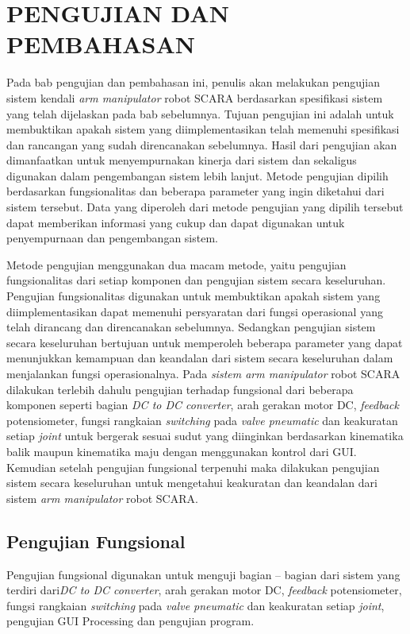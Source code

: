 
\chapter{PENGUJIAN DAN PEMBAHASAN}
Pada bab pengujian dan pembahasan ini, penulis akan melakukan pengujian sistem kendali\textit{ arm manipulator} robot SCARA berdasarkan spesifikasi sistem yang telah dijelaskan pada bab sebelumnya. Tujuan pengujian ini adalah untuk membuktikan apakah sistem yang diimplementasikan telah memenuhi spesifikasi dan rancangan yang sudah direncanakan sebelumnya. Hasil dari pengujian akan dimanfaatkan untuk menyempurnakan kinerja dari sistem dan sekaligus digunakan dalam pengembangan sistem lebih lanjut. Metode pengujian dipilih berdasarkan fungsionalitas dan beberapa parameter yang ingin diketahui dari sistem tersebut. Data yang diperoleh dari metode pengujian yang dipilih tersebut dapat memberikan informasi yang cukup dan dapat digunakan untuk penyempurnaan dan pengembangan sistem.

Metode pengujian menggunakan dua macam metode, yaitu pengujian fungsionalitas dari setiap komponen dan pengujian sistem secara keseluruhan. Pengujian fungsionalitas digunakan untuk membuktikan apakah sistem yang diimplementasikan dapat memenuhi persyaratan dari fungsi operasional yang telah dirancang dan direncanakan sebelumnya. Sedangkan pengujian sistem secara keseluruhan bertujuan untuk memperoleh beberapa parameter yang dapat menunjukkan kemampuan dan keandalan dari sistem secara keseluruhan dalam menjalankan fungsi operasionalnya. Pada \textit{sistem arm manipulator} robot SCARA dilakukan terlebih dahulu pengujian terhadap fungsional dari beberapa komponen seperti bagian \textit{DC to DC converter}, arah gerakan motor DC, \textit{feedback} potensiometer, fungsi rangkaian \textit{switching} pada \textit{valve pneumatic} dan keakuratan setiap \textit{joint} untuk bergerak sesuai sudut yang diinginkan berdasarkan kinematika balik maupun kinematika maju dengan menggunakan kontrol dari GUI.  Kemudian setelah pengujian fungsional terpenuhi maka dilakukan pengujian sistem secara keseluruhan untuk mengetahui keakuratan dan keandalan dari sistem \textit{arm manipulator} robot SCARA.

\section{Pengujian Fungsional}
Pengujian fungsional digunakan untuk menguji bagian – bagian dari sistem yang terdiri dari\textit{DC to DC converter}, arah gerakan motor DC, \textit{feedback} potensiometer, fungsi rangkaian \textit{switching} pada \textit{valve pneumatic} dan keakuratan setiap \textit{joint}, pengujian GUI Processing dan pengujian program. 


